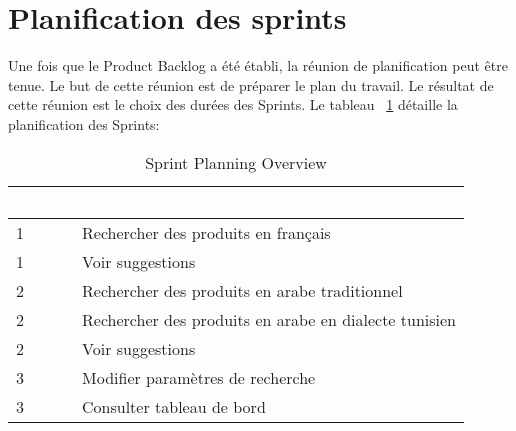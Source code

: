\section{Planification des sprints}
\noindent
Une fois que le Product Backlog a été établi, la réunion de planification peut être tenue. Le but de cette réunion est de préparer le plan du travail. Le résultat de cette réunion est le choix des durées des Sprints. Le tableau ~\ref{tab:sprint_planning} détaille la planification des Sprints: \\

\begin{table}[H]
\centering
\Large
{} %
\begin{tabular}{|p{3cm}|p{12cm}|}
\hline
\rowcolor{blue!50} \textcolor{white}{Sprint} & \textcolor{white}{CU à rèaliser} \\
\hline
1 & Rechercher des produits en français \\ \hline
1 & Voir suggestions \\ \hline
2 & Rechercher des produits en arabe traditionnel \\ \hline
2 & Rechercher des produits en arabe en dialecte tunisien \\ \hline
2 & Voir suggestions \\ \hline
3 & Modifier paramètres de recherche \\ \hline
3 & Consulter tableau de bord \\ \hline
\end{tabular}
\caption{Sprint Planning Overview}
\label{tab:sprint_planning}
\end{table}




